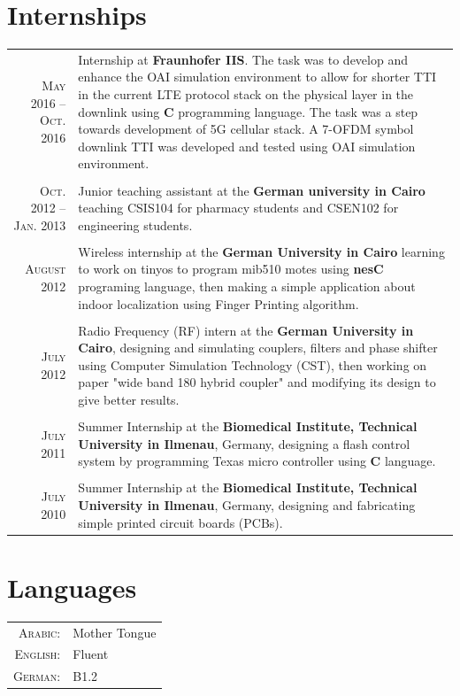\documentclass[a4paper,10pt]{article}
\begin{document}
\section{Internships}
\begin{tabular}{r|p{11cm}}
\textsc{May 2016 – Oct. 2016} & Internship at {\bf Fraunhofer IIS}. The task was to develop and enhance the {OAI} simulation environment to allow for shorter {TTI} in the current LTE protocol stack on the physical layer in the downlink using {\bf C} programming language. The task was a step towards development of 5G cellular stack. A 7-OFDM symbol downlink {TTI} was developed and tested using OAI simulation environment. \\
& \\ 
\textsc{Oct. 2012 – Jan. 2013} & Junior teaching assistant at the {\bf German university in Cairo} teaching CSIS104 for pharmacy students and CSEN102 for engineering students. \\
& \\
\textsc{August} 2012 & Wireless internship at the {\bf German University in Cairo} learning to work on tinyos to program mib510 motes using \textbf{nesC} programing language, then making a simple application about indoor localization using Finger Printing algorithm.\\
& \\
 \textsc{July} 2012 & Radio Frequency (RF) intern at the {\bf German University in Cairo}, designing and simulating couplers, filters and phase shifter using  Computer Simulation Technology (CST), then working on paper "wide band 180 hybrid coupler" and modifying its design to give better results.\\ 
& \\
\textsc{July} 2011 & Summer Internship at the {\bf Biomedical Institute, Technical University in Ilmenau}, Germany, designing a flash control system by programming Texas micro controller using \textbf{C} language.\\ 
& \\
 \textsc{July} 2010  & Summer Internship at the {\bf Biomedical Institute, Technical University in Ilmenau}, Germany, designing and fabricating simple printed circuit boards (PCBs).\\

\end{tabular}





\section{Languages}
\begin{tabular}{rl}
\textsc{Arabic:}&Mother Tongue\\
\textsc{English:}&Fluent\\
\textsc{German:}&B1.2\\
\end{tabular}
\end{document}
